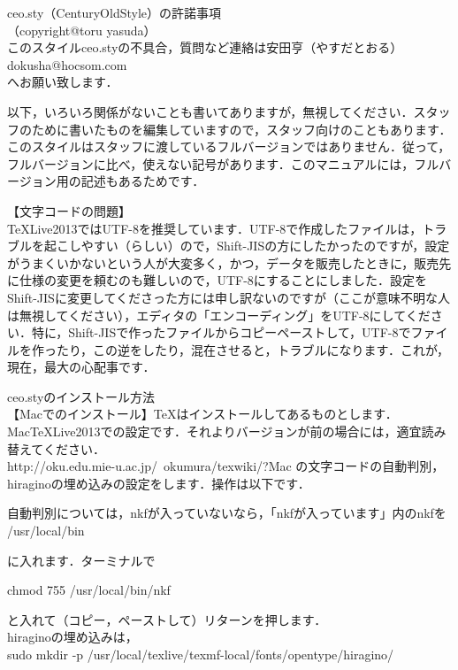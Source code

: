 \documentclass [10pt,fleqn,b5paper]{jsarticlek}
\begin{document}
 ceo.sty（CenturyOldStyle）の許諾事項\\
（copyright@toru yasuda）\\
このスタイルceo.styの不具合，質問など連絡は安田亨（やすだとおる）\\
dokusha@hocsom.com\\
へお願い致します．

以下，いろいろ関係がないことも書いてありますが，無視してください．スタッフのために書いたものを編集していますので，スタッフ向けのこともあります．このスタイルはスタッフに渡しているフルバージョンではありません．従って，フルバージョンに比べ，使えない記号があります．このマニュアルには，フルバージョン用の記述もあるためです．

【{\gt 文字コードの問題}】\\
TeXLive2013ではUTF-8を推奨しています．UTF-8で作成したファイルは，トラブルを起こしやすい（らしい）ので，Shift-JISの方にしたかったのですが，設定がうまくいかないという人が大変多く，かつ，データを販売したときに，販売先に仕様の変更を頼むのも難しいので，UTF-8にすることにしました．設定をShift-JISに変更してくださった方には申し訳ないのですが（ここが意味不明な人は無視してください），エディタの「エンコーディング」をUTF-8にしてください．特に，Shift-JISで作ったファイルからコピーペーストして，UTF-8でファイルを作ったり，この逆をしたり，混在させると，トラブルになります．これが，現在，最大の心配事です．\\

\vspace{2mm} 

\kagir  ceo.styのインストール方法\\
【Macでのインストール】TeXはインストールしてあるものとします．\\
MacTeXLive2013での設定です．それよりバージョンが前の場合には，適宜読み替えてください．\\
http://oku.edu.mie-u.ac.jp/~okumura/texwiki/?Mac
の文字コードの自動判別，hiraginoの埋め込みの設定をします．操作は以下です．

自動判別については，nkfが入っていないなら，「nkfが入っています」内のnkfを\\
/usr/local/bin

に入れます．ターミナルで

chmod 755 /usr/local/bin/nkf

と入れて（コピー，ペーストして）リターンを押します．\\
hiraginoの埋め込みは，\\
sudo mkdir -p /usr/local/texlive/texmf-local/fonts/opentype/hiragino/
\end{document}
